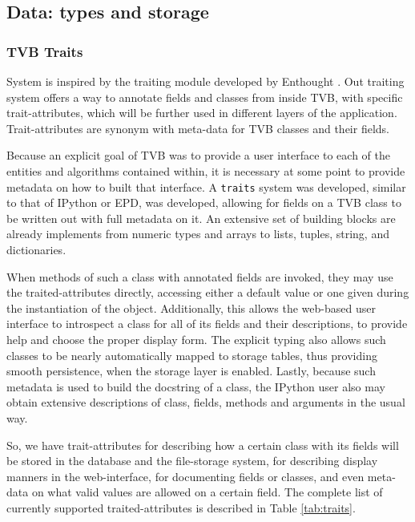 \subsection{Data: types and storage}



	\subsubsection{TVB Traits}

System is inspired by the traiting module developed by Enthought \cite{Enthought_2001}.
Out traiting system offers a way to annotate fields and classes from inside TVB, with specific trait-attributes,
which will be further used in different layers of the application.
Trait-attributes are synonym with meta-data for TVB classes and their fields.

Because an explicit goal of TVB was to provide a user interface to each of the
entities and algorithms contained within, it is necessary at some point to
provide metadata on how to built that interface. A \texttt{traits} system was developed, similar to that of
IPython or EPD, was developed, allowing for fields on a TVB class to
be written out with full metadata on it. An extensive set of  building 
blocks are already implements from numeric types and arrays to lists, tuples, 
string, and dictionaries.

 When methods of such a class with annotated fields are invoked,
they may use the traited-attributes directly, accessing either a default value
or one given during the instantiation of the object. Additionally, this allows
the web-based user interface to introspect a class for all of its fields and their
descriptions, to provide help and choose the proper display form. The explicit typing also allows
such classes to be nearly automatically mapped to storage tables,
thus providing smooth persistence, when the storage layer is enabled.  
Lastly, because such metadata is used to build the docstring of a class,
the IPython user also may obtain extensive descriptions of class, fields, methods and
arguments in the usual way. 

So, we have trait-attributes for describing how a certain class with its fields 
will be stored in the database and the file-storage system,
for describing display manners in the web-interface, for documenting fields or classes, 
and even meta-data on what valid values are allowed on a certain field. 
The complete list of currently supported traited-attributes is described in Table \ref{tab:traits}.

